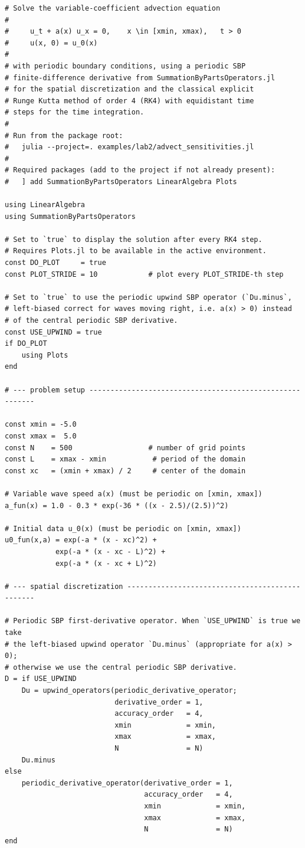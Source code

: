 \documentclass[11pt]{article}
\begin{document}
\begin{verbatim}
# Solve the variable-coefficient advection equation
#
#     u_t + a(x) u_x = 0,    x \in [xmin, xmax),   t > 0
#     u(x, 0) = u_0(x)
#
# with periodic boundary conditions, using a periodic SBP
# finite-difference derivative from SummationByPartsOperators.jl
# for the spatial discretization and the classical explicit
# Runge Kutta method of order 4 (RK4) with equidistant time
# steps for the time integration.
#
# Run from the package root:
#   julia --project=. examples/lab2/advect_sensitivities.jl
#
# Required packages (add to the project if not already present):
#   ] add SummationByPartsOperators LinearAlgebra Plots

using LinearAlgebra
using SummationByPartsOperators

# Set to `true` to display the solution after every RK4 step.
# Requires Plots.jl to be available in the active environment.
const DO_PLOT     = true
const PLOT_STRIDE = 10            # plot every PLOT_STRIDE-th step

# Set to `true` to use the periodic upwind SBP operator (`Du.minus`,
# left-biased correct for waves moving right, i.e. a(x) > 0) instead
# of the central periodic SBP derivative.
const USE_UPWIND = true
if DO_PLOT
    using Plots
end

# --- problem setup ---------------------------------------------------------

const xmin = -5.0
const xmax =  5.0
const N    = 500                  # number of grid points
const L    = xmax - xmin           # period of the domain
const xc   = (xmin + xmax) / 2     # center of the domain

# Variable wave speed a(x) (must be periodic on [xmin, xmax])
a_fun(x) = 1.0 - 0.3 * exp(-36 * ((x - 2.5)/(2.5))^2)

# Initial data u_0(x) (must be periodic on [xmin, xmax])
u0_fun(x,a) = exp(-a * (x - xc)^2) +
            exp(-a * (x - xc - L)^2) +
            exp(-a * (x - xc + L)^2)

# --- spatial discretization ------------------------------------------------

# Periodic SBP first-derivative operator. When `USE_UPWIND` is true we take
# the left-biased upwind operator `Du.minus` (appropriate for a(x) > 0);
# otherwise we use the central periodic SBP derivative.
D = if USE_UPWIND
    Du = upwind_operators(periodic_derivative_operator;
                          derivative_order = 1,
                          accuracy_order   = 4,
                          xmin             = xmin,
                          xmax             = xmax,
                          N                = N)
    Du.minus
else
    periodic_derivative_operator(derivative_order = 1,
                                 accuracy_order   = 4,
                                 xmin             = xmin,
                                 xmax             = xmax,
                                 N                = N)
end


\end{verbatim}
\end{document}
